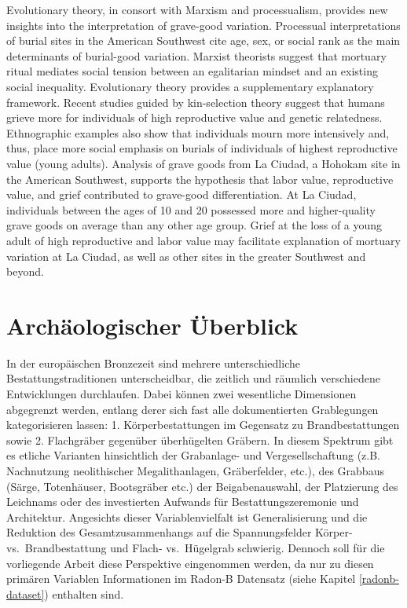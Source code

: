 \documentclass[openany,twoside,twocolumn]{book}
\begin{document}
Evolutionary theory, in consort with Marxism and processualism, provides
new insights into the interpretation of grave-good variation. Processual
interpretations of burial sites in the American Southwest cite age, sex,
or social rank as the main determinants of burial-good variation.
Marxist theorists suggest that mortuary ritual mediates social tension
between an egalitarian mindset and an existing social inequality.
Evolutionary theory provides a supplementary explanatory framework.
Recent studies guided by kin-selection theory suggest that humans grieve
more for individuals of high reproductive value and genetic relatedness.
Ethnographic examples also show that individuals mourn more intensively
and, thus, place more social emphasis on burials of individuals of
highest reproductive value (young adults). Analysis of grave goods from
La Ciudad, a Hohokam site in the American Southwest, supports the
hypothesis that labor value, reproductive value, and grief contributed
to grave-good differentiation. At La Ciudad, individuals between the
ages of 10 and 20 possessed more and higher-quality grave goods on
average than any other age group. Grief at the loss of a young adult of
high reproductive and labor value may facilitate explanation of mortuary
variation at La Ciudad, as well as other sites in the greater Southwest
and beyond.

\hypertarget{regions-archaeological-overview}{%
\section{Archäologischer
Überblick}\label{regions-archaeological-overview}}

In der europäischen Bronzezeit sind mehrere unterschiedliche
Bestattungstraditionen unterscheidbar, die zeitlich und räumlich
verschiedene Entwicklungen durchlaufen. Dabei können zwei wesentliche
Dimensionen abgegrenzt werden, entlang derer sich fast alle
dokumentierten Grablegungen kategorisieren lassen: 1. Körperbestattungen
im Gegensatz zu Brandbestattungen sowie 2. Flachgräber gegenüber
überhügelten Gräbern. In diesem Spektrum gibt es etliche Varianten
hinsichtlich der Grabanlage- und Vergesellschaftung (z.B. Nachnutzung
neolithischer Megalithanlagen, Gräberfelder, etc.), des Grabbaus (Särge,
Totenhäuser, Bootsgräber etc.) der Beigabenauswahl, der Platzierung des
Leichnams oder des investierten Aufwands für Bestattungszeremonie und
Architektur. Angesichts dieser Variablenvielfalt ist Generalisierung und
die Reduktion des Gesamtzusammenhangs auf die Spannungsfelder Körper-
vs.~Brandbestattung und Flach- vs.~Hügelgrab schwierig. Dennoch soll für
die vorliegende Arbeit diese Perspektive eingenommen werden, da nur zu
diesen primären Variablen Informationen im Radon-B Datensatz (siehe
Kapitel \ref{radonb-dataset}) enthalten sind.
\end{document}
